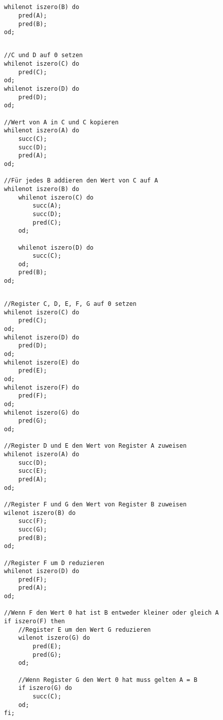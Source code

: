 \documentclass[a4paper,12pt,titlepage]{article}
\begin{document}
\subsection{}
\begin{lstlisting}[style = code]
whilenot iszero(B) do
	pred(A);
	pred(B);
od;
\end{lstlisting}
\subsection{}
\begin{lstlisting}[style = code]
//C und D auf 0 setzen
whilenot iszero(C) do
	pred(C);
od;
whilenot iszero(D) do
	pred(D);
od;

//Wert von A in C und C kopieren
whilenot iszero(A) do
	succ(C);
	succ(D);
	pred(A);
od;

//Für jedes B addieren den Wert von C auf A
whilenot iszero(B) do
	whilenot iszero(C) do
		succ(A);
		succ(D);
		pred(C);
	od;

	whilenot iszero(D) do
		succ(C);
	od;
	pred(B);
od;
\end{lstlisting}
\subsection{}
\begin{lstlisting}[style = code]
//Register C, D, E, F, G auf 0 setzen
whilenot iszero(C) do
	pred(C);
od;
whilenot iszero(D) do
	pred(D);
od;
whilenot iszero(E) do
	pred(E);
od;
whilenot iszero(F) do
	pred(F);
od;
whilenot iszero(G) do
	pred(G);
od;

//Register D und E den Wert von Register A zuweisen
whilenot iszero(A) do
	succ(D);
	succ(E);
	pred(A);
od;

//Register F und G den Wert von Register B zuweisen
wilenot iszero(B) do
	succ(F);
	succ(G);
	pred(B);
od;

//Register F um D reduzieren
whilenot iszero(D) do
	pred(F);
	pred(A);
od;

//Wenn F den Wert 0 hat ist B entweder kleiner oder gleich A
if iszero(F) then
	//Register E um den Wert G reduzieren
	wilenot iszero(G) do
		pred(E);
		pred(G);
	od;

	//Wenn Register G den Wert 0 hat muss gelten A = B
	if iszero(G) do
		succ(C);
	od;
fi;
\end{lstlisting}
\end{document}
